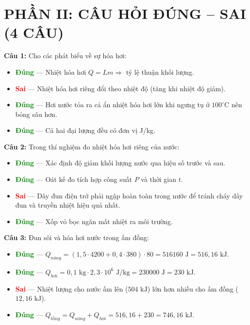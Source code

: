 \documentclass[12pt,a4paper]{article}
\newcommand{\dapan}[1]{\textcolor{green}{\textbf{#1}}}
\newcommand{\dapansai}[1]{\textcolor{red}{\textbf{#1}}}
\begin{document}

\section*{PHẦN II: CÂU HỎI ĐÚNG -- SAI (4 CÂU)}

\textbf{Câu 1:} Cho các phát biểu về sự hóa hơi:
\begin{itemize}
    \item[a.] \dapan{Đúng} — Nhiệt hóa hơi $Q = Lm \Rightarrow$ tỷ lệ thuận khối lượng.
    \item[b.] \dapansai{Sai} — Nhiệt hóa hơi riêng đổi theo nhiệt độ (tăng khi nhiệt độ giảm).
    \item[c.] \dapan{Đúng} — Hơi nước tỏa ra cả ẩn nhiệt hóa hơi lớn khi ngưng tụ ở $100^{\circ}\text{C}$ nên bỏng sâu hơn.
    \item[d.] \dapan{Đúng} — Cả hai đại lượng đều có đơn vị J/kg.
\end{itemize}

\textbf{Câu 2:} Trong thí nghiệm đo nhiệt hóa hơi riêng của nước:
\begin{itemize}
    \item[a.] \dapan{Đúng} — Xác định độ giảm khối lượng nước qua hiệu số trước và sau.
    \item[b.] \dapan{Đúng} — Oát kế đo tích hợp công suất $P$ và thời gian $t$.
    \item[c.] \dapansai{Sai} — Dây đun điện trở phải ngập hoàn toàn trong nước để tránh cháy dây đun và truyền nhiệt hiệu quả nhất.
    \item[d.] \dapan{Đúng} — Xốp vỏ bọc ngăn mất nhiệt ra môi trường.
\end{itemize}

\textbf{Câu 3:} Đun sôi và hóa hơi nước trong ấm đồng:
\begin{itemize}
    \item[a.] \dapan{Đúng} — $Q_{nóng} = (1{,}5 \cdot 4200 + 0{,}4 \cdot 380) \cdot 80 = 516160\text{ J} = 516{,}16\text{ kJ}$.
    \item[b.] \dapan{Đúng} — $Q_{hơi} = 0{,}1\text{ kg} \cdot 2{,}3 \cdot 10^6\text{ J/kg} = 230000\text{ J} = 230\text{ kJ}$.
    \item[c.] \dapansai{Sai} — Nhiệt lượng cho nước ấm lên ($504\text{ kJ}$) lớn hơn nhiều cho ấm đồng ($12{,}16\text{ kJ}$).
    \item[d.] \dapan{Đúng} — $Q_{tổng} = Q_{nóng} + Q_{hơi} = 516{,}16 + 230 = 746{,}16\text{ kJ}$.
\end{itemize}
\end{document}
